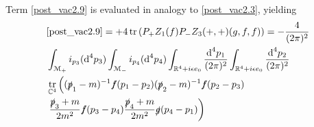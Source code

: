 \documentclass[oneside,reqno,12pt]{amsart}
\DeclareMathOperator{\tr}{tr}
\begin{document}
Term \eqref{post_vac2.9} is evaluated in analogy to \eqref{post_vac2.3}, yielding
\begin{align*}
&\eqref{post_vac2.9}=+4 \tr\left(P_+ Z_1(f)P_- Z_3(+,+)(g,f,f)\right)=-\frac{4}{(2\pi)^2}\\
&\int_{\mathcal{M_+}}  i_{p_3}(\text{d}^4p_{3}) 
\int_{\mathcal{M_-}}  i_{p_4}(\text{d}^4p_{4})
\int_{\mathbb{R}^4+i \epsilon e_0}\frac{\text{d}^4p_1}{(2\pi)^{2}}
\int_{\mathbb{R}^4+i \epsilon e_0}\frac{\text{d}^4p_2}{(2\pi)^{2}}
 \\
&\tr_{\mathbb{C}^4}\left( (\slashed{p}_1-m)^{-1}  \slashed{f}(p_{1}-p_2)  (\slashed{p}_2-m)^{-1} \slashed{f}(p_{2}-p_{3})   \right.\\
&\left.  \frac{\slashed{p}_3+m}{2m^2} \slashed{f}(p_{3}-p_{4})
 \frac{\slashed{p}_{4}+m}{2m^2} 
\slashed{g}(p_{4}-p_1)  \right)
\end{align*}
\end{document}
